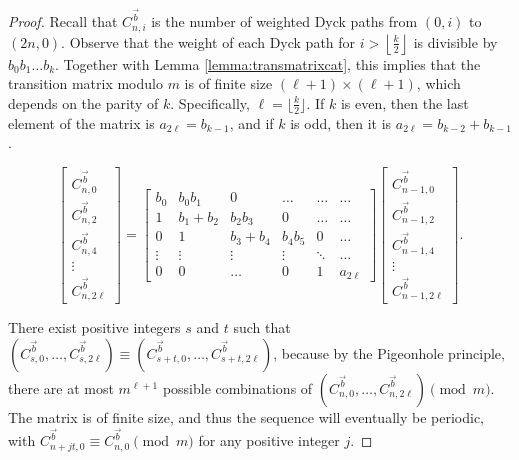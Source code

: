 \documentclass[10pt,a4paper]{amsart}
\begin{document}
\begin{proof}
Recall that $C^{\vec{b}}_{n,i}$ is the number of weighted Dyck paths from $(0,i)$ to $(2n,0)$. Observe that the weight of each Dyck path for $i > \left\lfloor \frac{k}{2} \right\rfloor$ is divisible by $b_0b_1\ldots b_k$. Together with Lemma \ref{lemma:transmatrixcat}, this implies that the transition matrix modulo $m$ is of finite size $(\ell + 1) \times (\ell + 1)$, which depends on the parity of $k$. Specifically, $\ell = \lfloor \frac{k}{2} \rfloor.$ If $k$ is even, then the last element of the matrix is $a_{2\ell} = b_{k-1}$, and if $k$ is odd, then it is ${a_{2\ell}} = b_{k-2}+b_{k-1}$. 

\[\begin{bmatrix}
C^{\vec{b}}_{n,0} \\
C^{\vec{b}}_{n,2} \\
C^{\vec{b}}_{n,4} \\
\vdots \\
C^{\vec{b}}_{n,2 \ell}
\end{bmatrix} = 
\begin{bmatrix}
b_0 & b_0 b_1 & 0 & \dots  &\dots &\dots \\
1 & b_1 + b_2 & b_2 b_3 & 0 & \dots &\dots \\
0 & 1 & b_3 + b_4 & b_4 b_5 & 0 & \dots \\
\vdots & \vdots & \vdots & \vdots & \ddots &\dots \\
0 & 0 & \dots & 0 & 1 & a_{2 \ell}
\end{bmatrix}
\begin{bmatrix}
C^{\vec{b}}_{n-1,0} \\
C^{\vec{b}}_{n-1,2} \\
C^{\vec{b}}_{n-1,4} \\
\vdots \\
C^{\vec{b}}_{n-1,2 \ell}
\end{bmatrix}.
\]

There exist positive integers $s$ and $t$ such that $(C^{\vec{b}}_{s,0}, \ldots, C^{\vec{b}}_{s,2\ell}) \equiv  (C^{\vec{b}}_{s+t,0}, \ldots, C^{\vec{b}}_{s+t,2\ell})$, because by the Pigeonhole principle, there are at most $m^{\ell+1}$ possible combinations of $(C^{\vec{b}}_{n,0}, \ldots, C^{\vec{b}}_{n,2\ell}) \pmod m$. The matrix is of finite size, and thus the sequence will eventually be periodic, with $C^{\vec{b}}_{n+jt,0} \equiv C^{\vec{b}}_{n,0} \pmod m$ for any positive integer $j$. \end{proof}
\end{document}
